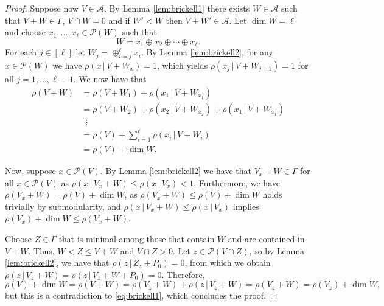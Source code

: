 \documentclass[10pt,a4paper]{amsart}
\newcommand{\A}{\mathcal{A}}
\renewcommand{\P}{\mathcal{P}}
\begin{document}
\begin{proof}
Suppose now $V\in \A$. By Lemma \ref{lem:brickell1} there exists $W\in \A$ such that $V+W \in \Gamma$, $V\cap W = 0$ and if $W'<W$ then $V +W'\in \A$. Let $\dim W =\ell$ and choose $x_1,\dots,x_\ell \in \P(W)$ such that
\[
    W = x_1 \oplus x_2 \oplus \cdots \oplus x_\ell.
\]
For each $j\in [\ell]$ let $W_j = \oplus^\ell_{i=j}x_i$.  By Lemma \ref{lem:brickell2}, for any $x\in \P(W)$ we have $\rho(x\,|\, V+W_x) = 1$, which yields $\rho(x_j \,|\, V+W_{j+1})=1$ for all $j=1,\ldots,\ell-1$. We now have that
\begin{align*}
    \rho(V+W)   &= \rho(V+W_1)+\rho(x_1 \,|\, V+W_{x_1}) \\
                &= \rho(V+W_2) + \rho(x_2 \,|\, V+W_{x_2}) + \rho(x_1 \,|\, V+W_{x_1}) \\
                &\: \,\,\vdots \\
                &= \rho(V) + \sum^{\ell}_{i=1} \rho(x_i \,|\, V+W_i) \\
                &= \rho(V) + \dim W.
\end{align*}

Now, suppose $x\in \P(V)$. By Lemma \ref{lem:brickell2} we have that $V_x + W\in \Gamma$ for all $x\in \P(V)$ as $\rho(x\,|\, V_x + W)  \leq \rho(x\,|\, V_x) <1$. Furthermore, we have $\rho(V_x+W) = \rho(V) + \dim W$, as $\rho(V_x+W)\leq \rho(V) + \dim W$ holds trivially by submodularity, and $\rho(x\,|\, V_x + W) \leq \rho(x\,|\, V_x)$ implies $ \rho(V_x) + \dim W \leq \rho(V_x+W)$.


Choose $Z\in \Gamma$ that is minimal among those that contain $W$ and are contained in $V+W$. Thus, $W<Z \leq V+W$ and $V\cap Z >0$. Let $z\in \P(V\cap Z)$, so by Lemma \ref{lem:brickell2}, we have that $\rho(z\,|\, Z_z +P_0) = 0$, from which we obtain $\rho(z\,|\, V_z + W) = \rho(z\,|\, V_z +W+P_0) = 0.$ Therefore,
\[
    \rho(V) + \dim W = \rho(V+W) = \rho(V_z+W) + \rho(z\,|\, V_z+W) = \rho(V_z+W) = \rho(V_z) + \dim W,
\]
but this is a contradiction to \eqref{eq:brickell1}, which concludes the proof.
\end{proof}
\end{document}
